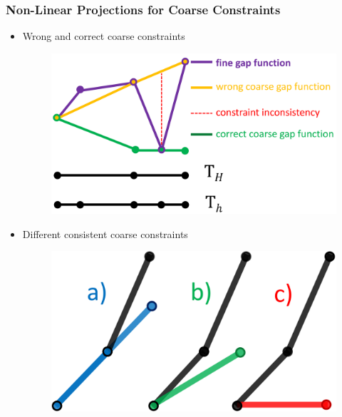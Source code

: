 \documentclass[8pt, oneside]{beamer}   	%
\newcommand{\colg}{\color{mygreen}}
\newcommand{\colgold}{\color{gold}}
\newcommand{\titlecolor}[1]{\frametitle{\textcolor{dkgrey}{ \textbf{#1}}}}
\begin{document}
\begin{frame}
\titlecolor{Non-Linear Projections for Coarse Constraints}
\begin{itemize}
\item {\colgold Wrong} and {\colg correct} coarse constraints
\begin{figure}[htbp!]
		\includegraphics[scale=0.15]{img/coarseconstraintrepresentation.pdf}
\end{figure}
\item Different consistent coarse constraints
\begin{figure}[htbp!]
		\includegraphics[scale=0.11]{img/coarseconstraintabc.pdf}
\end{figure}
\end{itemize}
\end{frame}
\end{document}
